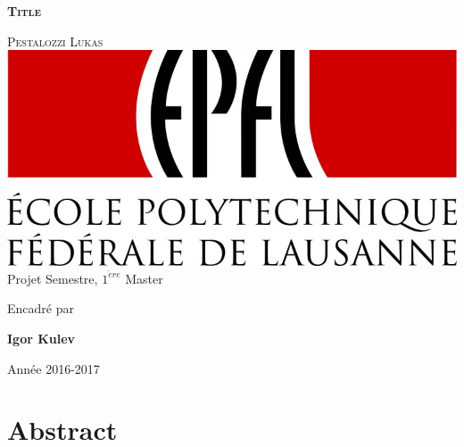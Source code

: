 \documentclass[a4paper, 11pt] {article}
\begin{document}

\thispagestyle{empty}	%

\begin{center}
\vspace*{1.5cm}
\huge\textsc{\textbf{Title}}

\vspace*{1.5cm}
\LARGE\textsc{Pestalozzi Lukas} \\[3cm]

\includegraphics[scale=0.6]{images/EPFL-Logo.jpg} \\[3cm]


\Large
Projet Semestre, $1^{\grave{e}re}$ Master

\vspace*{1cm}
Encadré par

\vspace*{1cm}
\textbf{Igor Kulev}

\vspace*{1cm}
Année 2016-2017

\end{center}

\newpage

{}
\section*{Abstract}



\newpage
{}

\renewcommand{\cftsecleader}{\cftdotfill{\cftsecdotsep}}
\renewcommand\cftsecdotsep{\cftdot}
\renewcommand\cftsubsecdotsep{\cftdot}
\tableofcontents
\newpage
\end{document}
